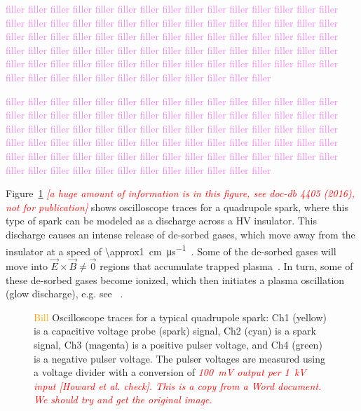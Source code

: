 \textcolor{violet}{filler filler filler filler filler filler filler filler filler filler filler filler filler filler filler filler filler filler filler filler filler filler filler filler filler filler filler filler filler filler filler filler filler filler filler filler filler filler filler filler filler filler filler filler filler filler filler filler filler filler filler filler filler filler filler filler filler filler filler filler filler filler filler filler filler filler filler filler filler filler filler filler filler filler filler filler filler filler filler filler filler filler filler filler filler filler filler}

\textcolor{violet}{filler filler filler filler filler filler filler filler filler filler filler filler filler filler filler filler filler filler filler filler filler filler filler filler filler filler filler filler filler filler filler filler filler filler filler filler filler filler filler filler filler filler filler filler filler filler filler filler filler filler filler filler filler filler filler filler filler filler filler filler filler filler filler filler filler filler filler filler filler filler filler filler filler filler filler filler filler filler filler filler filler filler filler filler filler filler filler}

Figure~\ref{fig:spark_signal} \textcolor{red}{\textit{[a huge amount of information is in this figure, see doc-db 4405 (2016), not for publication]}} shows oscilloscope traces for a quadrupole spark, where this type of spark can be modeled as a discharge across a HV insulator. This discharge causes an intense release of de-sorbed gases, which move away from the insulator at a speed of \SI[per-mode=symbol]{\approx1}{\cm\per\micro\second}~\cite{AVDIENKO1977643}. Some of the de-sorbed gases will move into $\vec{E}\times\vec{B}\neq\vec{0}$ regions that accumulate trapped plasma~\cite{Semertzidis:2003zs}. In turn, some of these de-sorbed gases become ionized, which then initiates a plasma oscillation (glow discharge), e.g. see ~\cite{Jackson:1998nia}.

\begin{figure}[]
	\centering
	\caption{\textcolor{orange}{Bill} Oscilloscope traces for a typical quadrupole spark: Ch1 (yellow) is a capacitive voltage probe (spark) signal, Ch2 (cyan) is a spark signal, Ch3 (magenta) is a positive pulser voltage, and Ch4 (green) is a negative pulser voltage. The pulser voltages are measured using a voltage divider with a conversion of \textcolor{red}{\textit{\SI{100}{\milli\volt} output per \SI{1}{\kilo\volt} input [Howard et al. check]. This is a copy from a Word document. We should try and get the original image.}}}\label{fig:spark_signal}
\end{figure}

